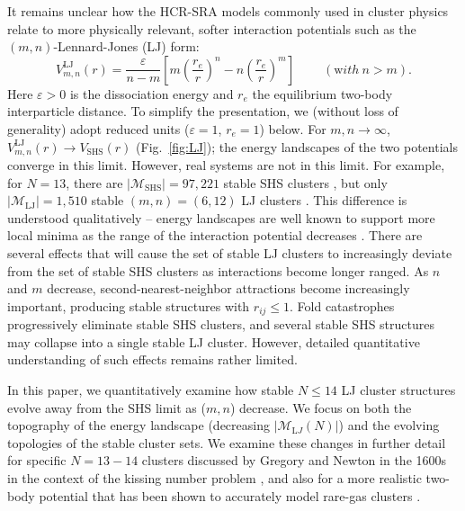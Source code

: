It remains unclear how the HCR-SRA models commonly
used in cluster physics relate to more physically relevant, softer interaction potentials such
as the $(m,n)$-Lennard-Jones (LJ) form:
\begin{equation}
V_{m,n}^\mathrm{LJ}(r)=\frac{\varepsilon}{n-m}\left[m\left(\frac{r_e}{r}\right)^{n}-n\left(\frac{r_e}{r}\right)^{m}\right] \ \ \ \ \ \ \ \ \ \  ({\mathrm with}\ n > m).
\label{eqn:nmpot}
\end{equation}
Here $\varepsilon>0$ is the dissociation energy and $r_e$ the equilibrium
two-body interparticle distance. To simplify the presentation,
we (without loss of generality) adopt reduced units ($\varepsilon=1$, $r_e=1$) below.
For $m,n\rightarrow \infty$,
$V_{m,n}^\mathrm{LJ}(r) \rightarrow V_\mathrm{SHS}(r)$ (Fig.~\ref{fig:LJ}); the
energy landscapes of the two potentials converge in this limit.  However, real
systems are not in this limit.  For example, for $N = 13$, there are $|\mathcal{M}_\mathrm{SHS}|=97,221$
stable \ac{SHS} clusters \autocite{Hoy_Structuredynamicsmodel_2015,Holmes-Cerfon_EnumeratingRigidSphere_2016},
but only $|\mathcal{M}_\mathrm{LJ}|=1,510$ stable $(m,n) = (6,12)$ LJ clusters \autocite{Doye_Evolutionpotentialenergy_1999}.  
This difference is understood qualitatively -- energy landscapes are well known to support more
local minima
as the range of the interaction potential decreases \autocite{braier90,Wales_MicroscopicBasisGlobal_2001}.
There are several effects that will cause the set of
stable LJ clusters to increasingly deviate from the set of stable \ac{SHS} clusters
as interactions become longer ranged.  As $n$ and $m$ decrease,
second-nearest-neighbor attractions become increasingly important,
producing stable structures with $r_{ij} \leq 1$.  Fold catastrophes
\autocite{Wales_MicroscopicBasisGlobal_2001,wales04} progressively eliminate stable \ac{SHS} clusters, and several stable \ac{SHS}
structures may collapse into a single stable LJ cluster.  However,
detailed quantitative understanding of such effects remains rather limited.

In this paper, we quantitatively examine how stable $N \leq 14$ LJ cluster
structures evolve away from the \ac{SHS} limit as ($m, n$) decrease.  We focus on
both the topography of the energy landscape (decreasing
$|\mathcal{M}_{\mathrm LJ}(N)|$) and the evolving topologies of the stable cluster sets.
We examine these changes in further detail for specific $N = 13-14$ clusters discussed by
Gregory and Newton in the 1600s in the context of the kissing number problem
\autocite{Schutte_ProblemdreizehnKugeln_1952}, and also for a more realistic two-body potential that has
been shown to accurately model rare-gas clusters \autocite{Schwerdtfeger_ExtensionLennardJonespotential_2006}.


